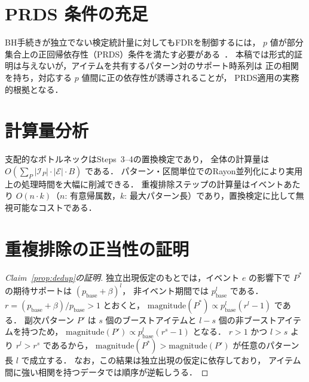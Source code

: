 \section{PRDS 条件の充足}\label{app:prds}

BH手続きが独立でない検定統計量に対してもFDRを制御するには，
$p$ 値が部分集合上の正回帰依存性（PRDS）条件を満たす必要がある~\cite{benjamini2001control}．
本稿では形式的証明は与えないが，アイテムを共有するパターン対のサポート時系列は
正の相関を持ち，対応する $p$ 値間に正の依存性が誘導されることが，
PRDS適用の実務的根拠となる．

\section{計算量分析}\label{app:complexity}

支配的なボトルネックはSteps~3--4の置換検定であり，
全体の計算量は $O\!\left(\sum_{P} |\mathcal{I}_P| \cdot |\mathcal{E}| \cdot B\right)$ である．
パターン・区間単位でのRayon並列化により実用上の処理時間を大幅に削減できる．
重複排除ステップの計算量はイベントあたり $O(n \cdot k)$（$n$: 有意帰属数，$k$: 最大パターン長）であり，置換検定に比して無視可能なコストである．

\section{重複排除の正当性の証明}\label{app:dedup_proof}

\begin{proof}[Claim~\ref{prop:dedup}の証明]
独立出現仮定のもとでは，イベント $e$ の影響下で
$P^*$ の期待サポートは $(p_{\text{base}} + \beta)^l$，
非イベント期間では $p_{\text{base}}^l$ である．
$r = (p_{\text{base}} + \beta) / p_{\text{base}} > 1$ とおくと，
$\text{magnitude}(P^*) \propto p_{\text{base}}^l (r^l - 1)$ である．
副次パターン $P'$ は $s$ 個のブーストアイテムと $l - s$ 個の非ブーストアイテムを持つため，
$\text{magnitude}(P') \propto p_{\text{base}}^l (r^s - 1)$ となる．
$r > 1$ かつ $l > s$ より $r^l > r^s$ であるから，
$\text{magnitude}(P^*) > \text{magnitude}(P')$ が任意のパターン長 $l$ で成立する．
なお，この結果は独立出現の仮定に依存しており，
アイテム間に強い相関を持つデータでは順序が逆転しうる．
\end{proof}

